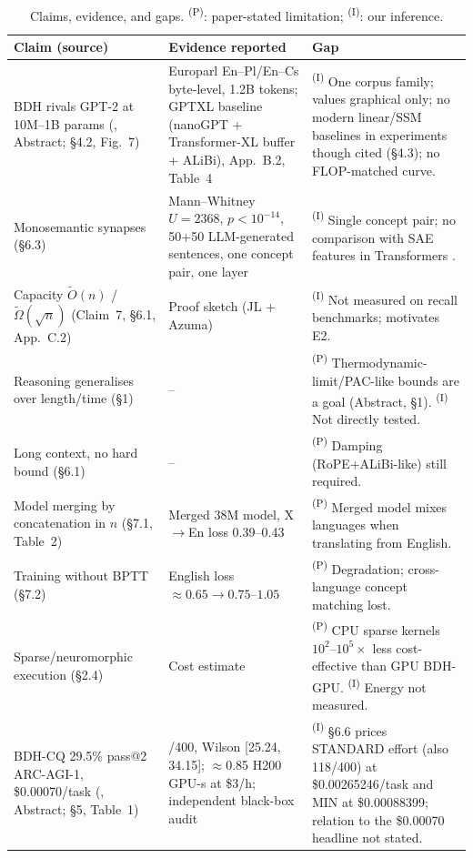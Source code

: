 \documentclass[10pt]{article}
\theoremstyle{remark}
\newcommand{\PS}{\textsuperscript{(P)}}
\newcommand{\IN}{\textsuperscript{(I)}}
\begin{document}
\begin{table}[t]
\centering
\scriptsize
\caption{Claims, evidence, and gaps. \PS: paper-stated limitation; \IN: our inference.}
\label{tab:critique}
\begin{tabularx}{\linewidth}{@{}>{\raggedright\arraybackslash}p{3.3cm}>{\raggedright\arraybackslash}X>{\raggedright\arraybackslash}X@{}}
\toprule
Claim (source) & Evidence reported & Gap \\
\midrule
BDH rivals GPT-2 at 10M--1B params (\citealp{kosowski2025bdh}, Abstract; \S4.2, Fig.~7) &
Europarl En--Pl/En--Cs byte-level, 1.2B tokens; GPTXL baseline (nanoGPT + Transformer-XL buffer + ALiBi), App.~B.2, Table~4 &
\IN{} One corpus family; values graphical only; no modern linear/SSM baselines in experiments though cited (\S4.3); no FLOP-matched curve.\\
Monosemantic synapses (\S6.3) & Mann--Whitney $U=2368$, $p<10^{-14}$, 50+50 LLM-generated sentences, one concept pair, one layer &
\IN{} Single concept pair; no comparison with SAE features in Transformers \citep{bricken2023monosemanticity}.\\
Capacity $\tilde O(n)$ / $\tilde\Omega(\sqrt n)$ (Claim~7, \S6.1, App.~C.2) & Proof sketch (JL + Azuma) &
\IN{} Not measured on recall benchmarks; motivates E2.\\
Reasoning generalises over length/time (\S1) & -- &
\PS{} Thermodynamic-limit/PAC-like bounds are a goal (Abstract, \S1). \IN{} Not directly tested.\\
Long context, no hard bound (\S6.1) & -- & \PS{} Damping (RoPE+ALiBi-like) still required.\\
Model merging by concatenation in $n$ (\S7.1, Table~2) & Merged 38M model, X$\to$En loss 0.39--0.43 &
\PS{} Merged model mixes languages when translating from English.\\
Training without BPTT (\S7.2) & English loss $\approx0.65\to0.75$--$1.05$ & \PS{} Degradation; cross-language concept matching lost.\\
Sparse/neuromorphic execution (\S2.4) & Cost estimate & \PS{} CPU sparse kernels $10^2$--$10^5\times$ less cost-effective than GPU BDH-GPU. \IN{} Energy not measured.\\
\midrule
BDH-CQ 29.5\% pass@2 ARC-AGI-1, \$0.00070/task (\citealp{engdahl2026bdhcq}, Abstract; \S5, Table~1) &
118/400, Wilson [25.24, 34.15]; $\approx$0.85 H200 GPU-s at \$3/h; independent black-box audit &
\IN{} \S6.6 prices STANDARD effort (also 118/400) at \$0.00265246/task and MIN at \$0.00088399; relation to the \$0.00070 headline not stated.\\

\end{tabularx}
\end{table}
\end{document}
